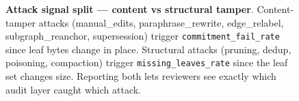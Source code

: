 \begin{figure}[t]
\centering
{}
\caption{\textbf{Attack signal split — content vs structural
tamper}. Content-tamper attacks (manual\_edits, paraphrase\_rewrite,
edge\_relabel, subgraph\_reanchor, supersession) trigger
\texttt{commitment\_fail\_rate} since leaf bytes change in place.
Structural attacks (pruning, dedup, poisoning, compaction) trigger
\texttt{missing\_leaves\_rate} since the leaf set changes size.
Reporting both lets reviewers see exactly which audit layer caught
which attack.}
\label{fig:attack-signal-split}
\end{figure}
